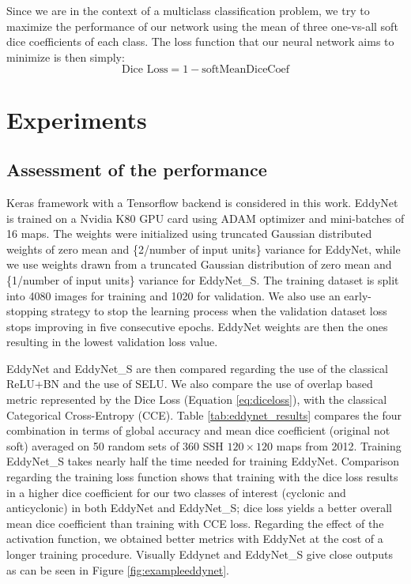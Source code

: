 \documentclass[journal]{IEEEtran}
\begin{document}
Since we are in the context of a multiclass classification problem, we try to maximize the performance of our network using the mean of three one-vs-all soft dice coefficients of each class. The loss function that our neural network aims to minimize is then simply:
\begin{equation}\label{eq:diceloss}
\text{Dice Loss}= 1 - \text{softMeanDiceCoef}
\end{equation}
\section{Experiments}
\subsection{Assessment of the performance}
Keras framework \cite{chollet2015keras} with a Tensorflow backend is considered in this work. EddyNet is trained on a Nvidia K80 GPU card using ADAM optimizer \cite{kingma2014adam} and mini-batches of 16 maps. The weights were initialized using truncated Gaussian distributed weights of zero mean and \{2/number of input units\} variance \cite{he2015delving} for EddyNet, while we use weights drawn from a truncated Gaussian distribution of zero mean and \{1/number of input units\} variance for EddyNet\_S. The training dataset is split into 4080 images for training and 1020 for validation. We also use an early-stopping strategy to stop the learning process when the validation dataset loss stops improving in five consecutive epochs. EddyNet weights are then the ones resulting in the lowest validation loss value.

EddyNet and EddyNet\_S are then compared regarding the use of the classical ReLU+BN and the use of SELU. We also compare the use of overlap based metric represented by the Dice Loss (Equation \ref{eq:diceloss}), with the classical Categorical Cross-Entropy (CCE). Table \ref{tab:eddynet_results} compares the four combination in terms of global accuracy and mean dice coefficient (original not soft) averaged on 50 random sets of 360 SSH $120\times 120$ maps from 2012. Training EddyNet\_S takes nearly half the time needed for training EddyNet. Comparison regarding the training loss function shows that training with the dice loss results in a higher dice coefficient for our two classes of interest (cyclonic and anticyclonic) in both EddyNet and EddyNet\_S; dice loss yields a better overall mean dice coefficient than training with CCE loss. Regarding the effect of the activation function, we obtained better metrics with EddyNet at the cost of a longer training procedure. Visually Eddynet and EddyNet\_S give close outputs as can be seen in Figure \ref{fig:exampleeddynet}.
\end{document}

